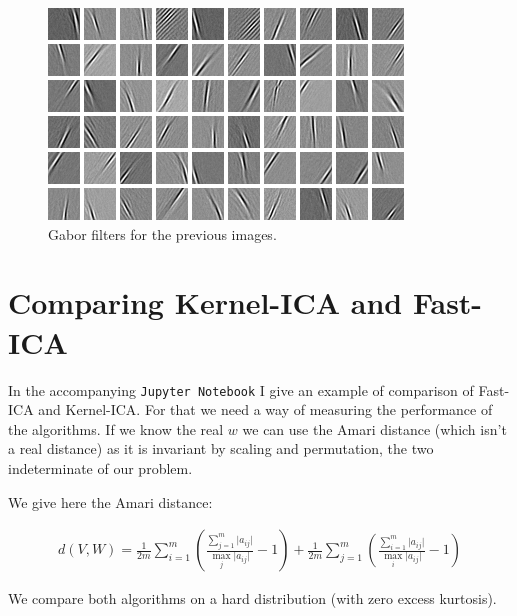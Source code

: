 \documentclass[a4paper,BCOR=5mm,oneside,openany]{scrreprt}
\begin{document}
\begin{figure}[H]
	\centering
	\includegraphics[width=\textwidth]{images/basis}
	\caption{Gabor filters for the previous images.}
\end{figure}

\section{Comparing Kernel-ICA and Fast-ICA}

In the accompanying \texttt{Jupyter Notebook} I give an example of comparison of Fast-ICA and Kernel-ICA. For that we need a way of measuring the performance of the algorithms. If we know the real $w$ we can use the Amari distance (which isn't a real distance) as it is invariant by scaling and permutation, the two indeterminate of our problem.

We give here the Amari distance:

\begin{align*}
	d(V,W) = \frac{1}{2 m} \sum_{i = 1}^m \left( \frac{\sum_{j = 1}^m \lvert a_{ij} \rvert}{\max_j \lvert a_{ij} \rvert} - 1 \right) + \frac{1}{2 m} \sum_{j = 1}^m \left( \frac{\sum_{i = 1}^m \lvert a_{ij} \rvert}{\max_i \lvert a_{ij} \rvert} - 1 \right)
\end{align*}

We compare both algorithms on a hard distribution (with zero excess kurtosis).
\end{document}
